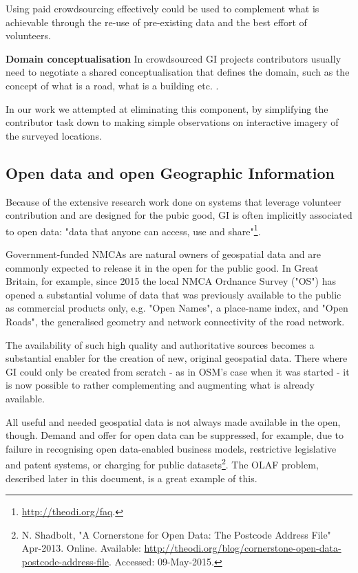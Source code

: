 Using paid crowdsourcing effectively could be used to complement what is achievable through the re-use of pre-existing data and the best effort of volunteers.

\textbf{Domain conceptualisation} In crowdsourced GI projects contributors usually need to negotiate a shared conceptualisation that defines the domain, such as the concept of what is a road, what is a building etc. \cite{Ballatore:2015kg}. 

In our work we attempted at eliminating this component, by simplifying the contributor task down to making simple observations on interactive imagery of the surveyed locations.

\subsection{Open data and open Geographic Information}
\label{open-data-and-gi}

Because of the extensive research work done on systems that leverage volunteer contribution and are designed for the pubic good, GI is often implicitly associated to open data: "data that anyone can access, use and share"\footnote{\url{http://theodi.org/faq}.}. 

Government-funded NMCAs are natural owners of geospatial data and are commonly expected to release it in the open for the public good. In Great Britain, for example, since 2015 the local NMCA Ordnance Survey ("OS") has opened a substantial volume of data that was previously available to the public as commercial products only, e.g. "Open Names", a place-name index, and "Open Roads", the generalised geometry and network connectivity of the road network.
	
The availability of such high quality and authoritative sources becomes a substantial enabler for the creation of new, original geospatial data. There where GI could only be created from scratch - as in OSM's case when it was started - it is now possible to rather complementing and augmenting what is already available.

All useful and needed geospatial data is not always made available in the open, though. Demand and offer for open data can be suppressed, for example, due to failure in recognising open data-enabled business models, restrictive legislative and patent systems, or charging for public datasets\footnote{N. Shadbolt, "A Cornerstone for Open Data: The Postcode Address File" Apr-2013. Online. Available: \url{http://theodi.org/blog/cornerstone-open-data-postcode-address-file}. Accessed: 09-May-2015.}. The OLAF problem, described later in this document, is a great example of this.
	
